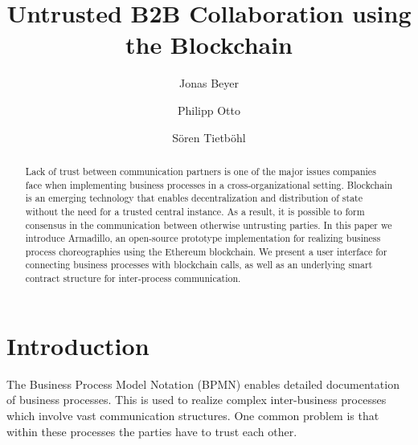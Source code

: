 \documentclass[runningheads]{llncs}
\begin{document}
%
\title{Untrusted B2B Collaboration using the Blockchain}
%
%
\author{Jonas Beyer \and Philipp Otto \and S\"oren Tietb\"ohl}
%
%
%
\maketitle %
%
\begin{abstract}
	Lack of trust between communication partners is one of the major issues companies face when implementing business processes in a cross-organizational setting.
	Blockchain is an emerging technology that enables decentralization and distribution of state without the need for a trusted central instance.
	As a result, it is possible to form consensus in the communication between otherwise untrusting parties.
	In this paper we introduce Armadillo, an open-source prototype implementation for realizing business process choreographies using the Ethereum blockchain.
	We present a user interface for connecting business processes with blockchain calls, as well as an underlying smart contract structure for inter-process communication.

\end{abstract}
%
%
%
\section{Introduction}





The Business Process Model Notation (BPMN) enables detailed documentation of business processes. This is used to realize complex inter-business processes which involve vast communication structures. One common problem is that within these processes the parties have to trust each other.
\end{document}
